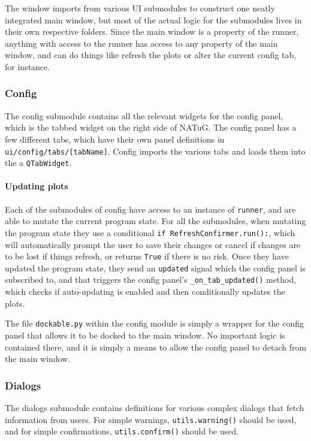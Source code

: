 \documentclass[titlepage]{article}
\begin{document}
	The window imports from various UI submodules to construct one neatly integrated main window, but most of the actual logic for the submodules lives in their own respective folders. Since the main window is a property of the runner, anything with access to the runner has access to any property of the main window, and can do things like refresh the plots or alter the current config tab, for instance.
	
	\subsubsection{Config}
	The config submodule contains all the relevant widgets for the config panel, which is the tabbed widget on the right side of NATuG. The config panel has a few different tabs, which have their own panel definitions in \texttt{ui/config/tabs/[tabName]}. Config imports the various tabs and loads them into the a \texttt{QTabWidget}.
	
	\paragraph{Updating plots}
	Each of the submodules of config have access to an instance of \texttt{runner}, and are able to mutate the current program state. For all the submodules, when mutating the program state they use a conditional \texttt{if RefreshConfirmer.run():}, which will automatically prompt the user to save their changes or cancel if changes are to be lost if things refresh, or returns \texttt{True} if there is no risk. Once they have updated the program state, they send an \texttt{updated} signal which the config panel is subscribed to, and that triggers the config panel's \texttt{\_on\_tab\_updated()} method, which checks if auto-updating is enabled and then conditionally updates the plots.
	
	The file \texttt{dockable.py} within the config module is simply a wrapper for the config panel that allows it to be docked to the main window. No important logic is contained there, and it is simply a means to allow the config panel to detach from the main window.
	
	\subsubsection{Dialogs}
	The dialogs submodule contains definitions for various complex dialogs that fetch information from users. For simple warnings, \texttt{utils.warning()} should be used, and for simple confirmations, \texttt{utils.confirm()} should be used. 
	
\end{document}
